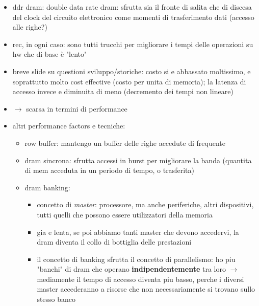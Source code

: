 \begin{itemize}
  \item ddr dram: double data rate dram: sfrutta sia il fronte di salita che di discesa del clock del circuito elettronico come momenti di trasferimento dati (accesso alle righe?)
  \item rec, in ogni caso: sono tutti trucchi per migliorare i tempi delle operazioni su hw che di base \`e "lento"
  \item breve slide su questioni sviluppo/storiche: costo si e abbassato moltissimo, e soprattutto molto cost effective (costo per unita di memoria); la latenza di accesso invece e diminuita di meno (decremento dei tempi non lineare)
  \item $\rightarrow$ scarsa in termini di performance
  \item altri performance factors e tecniche:
    \begin{itemize}
      \item row buffer: mantengo un buffer delle righe accedute di frequente
      \item dram sincrona: sfrutta accessi in burst per migliorare la banda (quantita di mem acceduta in un periodo di tempo, o trasferita)
      \item dram banking: 
        \begin{itemize}
          \item concetto di \textit{master}: processore, ma anche periferiche, altri dispositivi, tutti quelli che possono essere utilizzatori della memoria
          \item gia e lenta, se poi abbiamo tanti master che devono accedervi, la dram diventa il collo di bottiglia delle prestazioni
          \item il concetto di banking sfrutta il concetto di parallelismo: ho piu "banchi" di dram che operano \textbf{indipendentemente} tra loro $\rightarrow$ mediamente il tempo di accesso diventa piu basso, perche i diversi master accederanno a risorse che non necessariamente si trovano sullo stesso banco
        \end{itemize}  
    \end{itemize}


\end{itemize}
